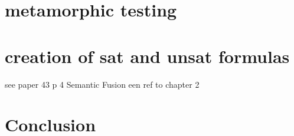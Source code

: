 
\section{metamorphic testing}


\section{creation of sat and unsat formulas}
see paper 43 p 4
Semantic Fusion
\cite{43YinYang}
een ref to chapter 2

\section{Conclusion}
\label{impl:conclusion}

